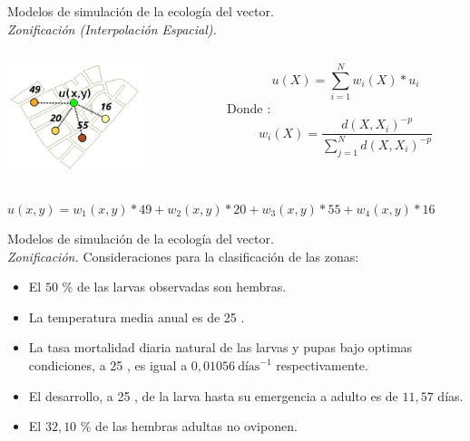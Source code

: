 \begin{frame}[t]{Modelos de simulación de la ecología del vector.\\\textit{Zonificación (Interpolación Espacial).}}
  \begin{center}
   \begin{columns}[T]
        \begin{column}[T]{3.5cm}
            \includegraphics[width=4cm]{./graphics/interpolacion-ej.png}
        \end{column}
        \begin{column}[T]{7cm}
        \begin{equation}\label{eq:interpolacion-idw}
         u(X) = \sum_{i=1}^{N} w_i(X) * u_{i}
        \end{equation}
        Donde :
        \begin{equation}
        w_i(X) =  \dfrac{d(X, X_i)^{-p}}{\sum_{j=1}^{N} d(X, X_i)^{-p}}
        \end{equation}
        \end{column}
    \end{columns}
  \end{center}
    $u(x,y) = w_1(x,y) * 49 + w_2(x,y) * 20 + w_3(x,y) * 55 + w_4(x,y) * 16 $
\end{frame}



\begin{frame}[c]{Modelos de simulación de la ecología del vector.\\\textit{Zonificación.}}
  Consideraciones para la clasificación de las zonas:
  \begin{itemize}
      \item El $50$ \% de las larvas observadas son hembras.
      \item La temperatura media anual es de 25 \textcelsius.
      \item La tasa mortalidad diaria natural de las larvas y pupas bajo optimas condiciones, a 25 \textcelsius, es igual a $0,01056\ \text{días}^{-1}$ respectivamente.
      \item El desarrollo, a 25 \textcelsius, de la larva hasta su emergencia a adulto es de $11,57$ días.
      \item El $32,10$ \% de las hembras adultas no oviponen.
  \end{itemize}
\end{frame}

